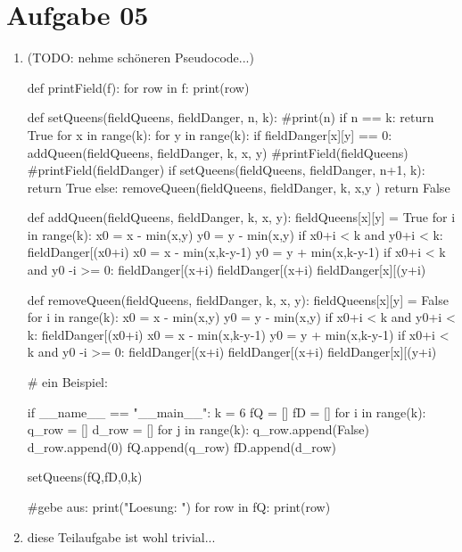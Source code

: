 \documentclass[10pt,a4paper]{article}
\begin{document}
\section*{Aufgabe 05}
    \begin{enumerate}[label={\alph*)}]
        \item (TODO: nehme sch\"oneren Pseudocode...)
            \begin{python}[frame=single]
def printField(f):
    for row in f:
        print(row)

def setQueens(fieldQueens, fieldDanger, n, k):
    #print(n)
    if n == k:
        return True
    for x in range(k):
        for y in range(k):
            if fieldDanger[x][y] == 0:
                addQueen(fieldQueens, fieldDanger, k, x, y)
                #printField(fieldQueens)
                #printField(fieldDanger)
                if setQueens(fieldQueens, fieldDanger, n+1, k):
                    return True
                else:
                    removeQueen(fieldQueens, fieldDanger, k, x,y )
    return False

def addQueen(fieldQueens, fieldDanger, k, x, y):
    fieldQueens[x][y] = True
    for i in range(k):
        x0 = x - min(x,y)
        y0 = y - min(x,y)
        if x0+i < k and y0+i < k:
            fieldDanger[(x0+i) %
        x0 = x - min(x,k-y-1)
        y0 = y + min(x,k-y-1)
        if x0+i < k and y0 -i >= 0:
            fieldDanger[(x+i)%
        fieldDanger[(x+i)%
        fieldDanger[x][(y+i)%

def removeQueen(fieldQueens, fieldDanger, k, x, y):
    fieldQueens[x][y] = False
    for i in range(k):
        x0 = x - min(x,y)
        y0 = y - min(x,y)
        if x0+i < k and y0+i < k:
            fieldDanger[(x0+i) %
        x0 = x - min(x,k-y-1)
        y0 = y + min(x,k-y-1)
        if x0+i < k and y0 -i >= 0:
            fieldDanger[(x+i)%
        fieldDanger[(x+i)%
        fieldDanger[x][(y+i)%

# ein Beispiel:

if __name__ == "__main__":
    k = 6
    fQ = []
    fD = []
    for i in range(k):
        q_row = []
        d_row = []
        for j in range(k):
            q_row.append(False)
            d_row.append(0)
        fQ.append(q_row)
        fD.append(d_row)

    setQueens(fQ,fD,0,k)

    #gebe aus:
    print("Loesung: ")
    for row in fQ:
        print(row)
            \end{python}
            
            \item diese Teilaufgabe ist wohl trivial...

    \end{enumerate}
\end{document}
